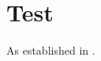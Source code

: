 \documentclass{ui1activity}
\begin{document}
\section{Test}
As established in \cite{sts751_1984}.
\makebibliography
\end{document}
